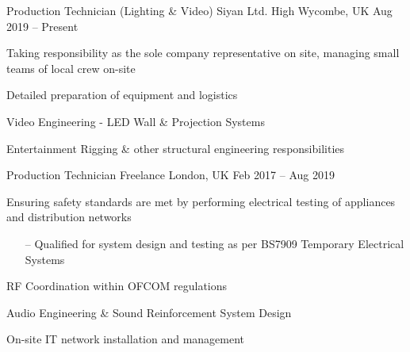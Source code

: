 \begin{cventries}
  \cventry
    {Production Technician (Lighting \& Video)}
    {Siyan Ltd.}
    {High Wycombe, UK}
    {Aug 2019 -- Present}
    {
      \begin{cvitems}
        \item Taking responsibility as the sole company representative on site, managing small teams of local crew on-site
        \item Detailed preparation of equipment and logistics
        \item Video Engineering - LED Wall \& Projection Systems
        \item Entertainment Rigging \& other structural engineering responsibilities
      \end{cvitems}
    }

  \cventry
    {Production Technician}
    {Freelance}
    {London, UK}
    {Feb 2017 -- Aug 2019}
    {
      \begin{cvitems}
        \item Ensuring safety standards are met by performing electrical testing of appliances and distribution networks
        \begin{itemize}
            \item[--] Qualified for system design and testing as per BS7909 Temporary Electrical Systems
        \end{itemize}
        \item RF Coordination within OFCOM regulations
        \item Audio Engineering \& Sound Reinforcement System Design
        \item On-site IT network installation and management
      \end{cvitems}
    }


\end{cventries}
